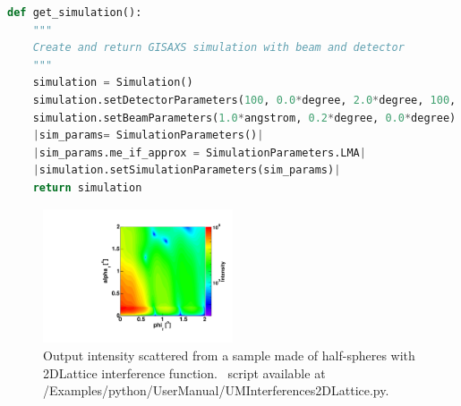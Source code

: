 \begin{lstlisting}[language=python, style=eclipseboxed,numbers=none,nolol]
def get_simulation():
    """
    Create and return GISAXS simulation with beam and detector
    """
    simulation = Simulation()
    simulation.setDetectorParameters(100, 0.0*degree, 2.0*degree, 100, 0.0*degree, 2.0*degree, True)
    simulation.setBeamParameters(1.0*angstrom, 0.2*degree, 0.0*degree)
    |sim_params= SimulationParameters()|
    |sim_params.me_if_approx = SimulationParameters.LMA|
    |simulation.setSimulationParameters(sim_params)|
    return simulation
\end{lstlisting}


\begin{figure}[h]
\begin{center}
\includegraphics[width=0.5\textwidth]{Figures/HSphere_2Dlattice}
\end{center}
\caption{Output intensity scattered from a sample made of half-spheres with 2DLattice interference function. \Python\ script available at {/Examples/python/UserManual/UMInterferences2DLattice.py}.}
\label{fig:2dlatticeintensity}
\end{figure}

\FloatBarrier

\newpage{\cleardoublepage}
